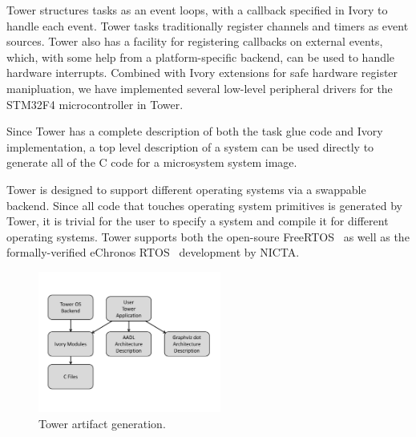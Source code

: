 
Tower structures tasks as an event loops,  with a callback specified in Ivory to
handle each  event. Tower  tasks traditionally register  channels and  timers as
event sources. Tower  also has a facility for registering  callbacks on external
events, which, with  some help from a platform-specific backend,  can be used to
handle hardware  interrupts. Combined  with Ivory  extensions for  safe hardware
register manipluation, we have  implemented several low-level peripheral drivers
for the STM32F4 microcontroller in Tower.  

Since Tower has a complete description of both the task glue code and Ivory
implementation, a top level description of a system can be used directly to
generate all of the C code for a microsystem system image.

Tower is designed to support different operating systems via a swappable
backend. Since all code that touches operating system primitives is generated by
Tower, it is trivial for the user to specify a system and compile it for
different operating systems. Tower supports both the open-soure
FreeRTOS~\cite{freertos} as well as the
formally-verified eChronos
RTOS~\cite{echronos} development
by NICTA.

\begin{figure}
  \begin{center}
\includegraphics[width=6cm]{figures/tower-artifacts-dia}
  \end{center}
  \caption[Tower artifacts]{Tower artifact generation.}
\label{fig:towerArtifacts}
\end{figure}

